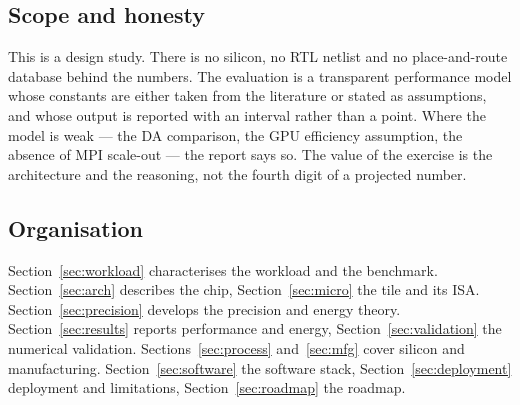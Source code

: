 \subsection{Scope and honesty}
This is a design study. There is no silicon, no RTL netlist and no place-and-route database behind
the numbers. The evaluation is a transparent performance model whose constants are either taken
from the literature or stated as assumptions, and whose output is reported with an interval rather
than a point. Where the model is weak --- the DA comparison, the GPU efficiency assumption, the
absence of MPI scale-out --- the report says so. The value of the exercise is the architecture and
the reasoning, not the fourth digit of a projected number.

\subsection{Organisation}
Section~\ref{sec:workload} characterises the workload and the benchmark.
Section~\ref{sec:arch} describes the chip, Section~\ref{sec:micro} the tile and its ISA.
Section~\ref{sec:precision} develops the precision and energy theory.
Section~\ref{sec:results} reports performance and energy, Section~\ref{sec:validation} the
numerical validation. Sections~\ref{sec:process} and~\ref{sec:mfg} cover silicon and
manufacturing. Section~\ref{sec:software} the software stack, Section~\ref{sec:deployment}
deployment and limitations, Section~\ref{sec:roadmap} the roadmap.

